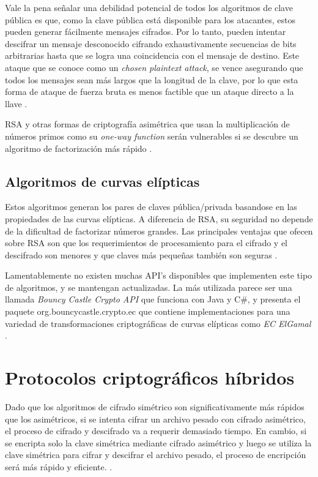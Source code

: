 Vale la pena señalar una debilidad potencial de todos los algoritmos de clave 
pública es que, como la clave pública está disponible para los atacantes, estos pueden 
generar fácilmente mensajes cifrados.
Por lo tanto, pueden intentar descifrar un mensaje desconocido cifrando exhaustivamente
secuencias de bits arbitrarias hasta que se logra una coincidencia con el mensaje 
de destino. Este ataque que se conoce como un \emph{chosen plaintext attack}, se 
vence asegurando que todos los mensajes
sean más largos que la longitud de la clave, por lo que esta forma de ataque de 
fuerza bruta es menos factible que un ataque directo a la llave \cite{coulouris}.

RSA y otras formas de criptografía asimétrica que usan la multiplicación de 
números primos como su \emph{one-way function} serán vulnerables si se descubre 
un algoritmo de factorización más rápido \cite{coulouris}.

\subsection{Algoritmos de curvas elípticas}\label{secc:elliptic}

Estos algoritmos generan los pares de claves pública/privada basandose en las 
propiedades de las curvas 
elípticas. A diferencia de RSA, su seguridad no depende de la dificultad de 
factorizar números grandes.
Las principales ventajas que ofecen sobre RSA son que los requerimientos de 
procesamiento para el cifrado y el descifrado son menores y que claves 
más pequeñas también son seguras \cite{coulouris}.

Lamentablemente no existen muchas API's disponibles que implementen este tipo de 
algoritmos, y se mantengan actualizadas. La más utilizada parece ser una 
llamada \emph{Bouncy Castle Crypto API} que funciona con Java y C\#, 
y presenta el paquete org.bouncycastle.crypto.ec que contiene implementaciones 
para una variedad de transformaciones criptográficas de curvas elípticas como 
\emph{EC ElGamal} \cite{bouncycastle}.

\section{Protocolos criptográficos híbridos}\label{secc:hybrid}
Dado que los algoritmos de cifrado simétrico son significativamente más rápidos 
que los asimétricos, 
si se intenta cifrar un archivo pesado con cifrado asimétrico, el proceso de 
cifrado y descifrado va a requerir demasiado tiempo. 
En cambio, si se encripta solo la clave simétrica mediante cifrado asimétrico 
y luego se utiliza la clave simétrica para cifrar y descifrar el archivo 
pesado, el proceso de encripción será más rápido y eficiente. 
\cite{stackexchange-hybrid}.

